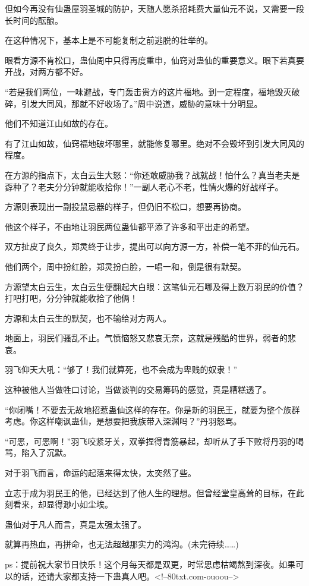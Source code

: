 \begin{this_body}
但如今再没有仙蛊屋羽圣城的防护，天随人愿杀招耗费大量仙元不说，又需要一段长时间的酝酿。

在这种情况下，基本上是不可能复制之前逃脱的壮举的。

眼看方源不肯松口，蛊仙周中只得再度重申，仙窍对蛊仙的重要意义。眼下若真要开战，对两方都不好。

“若是我们两位，一味避战，专门轰击贵方的这片福地。到一定程度，福地毁灭破碎，引发大同风，那就不好收场了。”周中说道，威胁的意味十分明显。

他们不知道江山如故的存在。

有了江山如故，仙窍福地破坏哪里，就能修复哪里。绝对不会毁坏到引发大同风的程度。

在方源的指点下，太白云生大怒：“你还敢威胁我？战就战！怕什么？真当老夫是孬种了？老夫分分钟就能收拾你！”一副人老心不老，性情火爆的好战样子。

方源则表现出一副投鼠忌器的样子，但仍旧不松口，想要再协商。

他这个样子，不由地让羽民两位蛊仙都平添了许多和平出走的希望。

双方扯皮了良久，郑灵终于让步，提出可以向方源一方，补偿一笔不菲的仙元石。

他们两个，周中扮红脸，郑灵扮白脸，一唱一和，倒是很有默契。

方源望太白云生，太白云生便翻起大白眼：这笔仙元石哪及得上数万羽民的价值？打吧打吧，分分钟就能收拾了他俩！

方源和太白云生的默契，也不输给对方两人。

地面上，羽民们骚乱不止。气愤恼怒又悲哀无奈，这就是残酷的世界，弱者的悲哀。

羽飞仰天大吼：“够了！我们就算死，也不会成为卑贱的奴隶！”

这种被他人当做牲口讨论，当做谈判的交易筹码的感觉，真是糟糕透了。

“你闭嘴！不要去无故地招惹蛊仙这样的存在。你是新的羽民王，就要为整个族群考虑。你这样嘲讽蛊仙，是想要把我族带入深渊吗？”丹羽怒骂。

“可恶，可恶啊！”羽飞咬紧牙关，双拳捏得青筋暴起，却听从了手下败将丹羽的喝骂，陷入了沉默。

对于羽飞而言，命运的起落来得太快，太突然了些。

立志于成为羽民王的他，已经达到了他人生的理想。但曾经堂皇高耸的目标，在此刻看来，却显得渺小如尘埃。

蛊仙对于凡人而言，真是太强太强了。

就算再热血，再拼命，也无法超越那实力的鸿沟。(未完待续……)

ps：提前祝大家节日快乐！这个月每天都是双更，时常思虑枯竭熬到深夜。如果可以的话，还请大家都支持一下蛊真人吧。<!--80txt.com-ouoou-->

\end{this_body}

